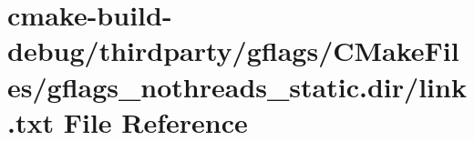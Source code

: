 \hypertarget{thirdparty_2gflags_2CMakeFiles_2gflags__nothreads__static_8dir_2link_8txt}{}\section{cmake-\/build-\/debug/thirdparty/gflags/\+C\+Make\+Files/gflags\+\_\+nothreads\+\_\+static.dir/link.txt File Reference}
\label{thirdparty_2gflags_2CMakeFiles_2gflags__nothreads__static_8dir_2link_8txt}
